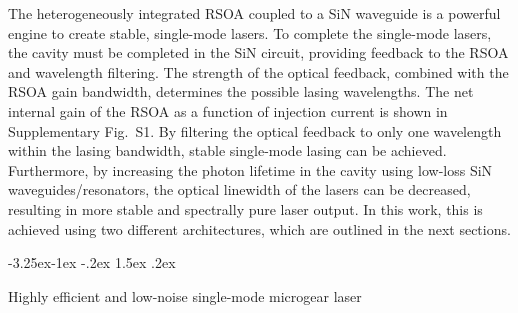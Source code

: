 \documentclass[%
 reprint,
 amsmath,amssymb,
 aps,
]{revtex4-2}
\makeatletter
\renewcommand\subsection{\@startsection {subsection}{2}{0pt}%
  {-3.25ex\@plus -1ex \@minus -.2ex}%
  {1.5ex \@plus .2ex}%
  {\normalfont\normalsize\bfseries\raggedright}}
\makeatother
\begin{document}
The heterogeneously integrated RSOA coupled to a SiN waveguide is a powerful engine to create stable, single-mode lasers. To complete the single-mode lasers, the cavity must be completed in the SiN circuit, providing feedback to the RSOA and wavelength filtering. The strength of the optical feedback, combined with the RSOA gain bandwidth, determines the possible lasing wavelengths. The net internal gain of the RSOA as a function of injection current is shown in Supplementary Fig.~S1. By filtering the optical feedback to only one wavelength within the lasing bandwidth, stable single-mode lasing can be achieved. Furthermore, by increasing the photon lifetime in the cavity using low-loss SiN waveguides/resonators, the optical linewidth of the lasers can be decreased, resulting in more stable and spectrally pure laser output. In this work, this is achieved using two different architectures, which are outlined in the next sections. 


\subsection{\label{sec:microgear} Highly efficient and low-noise single-mode microgear laser}
\end{document}
